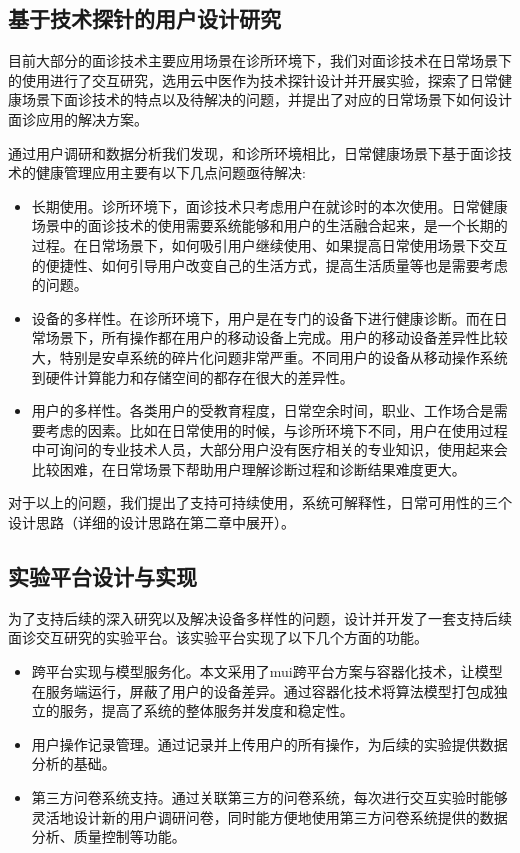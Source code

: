 \subsection{基于技术探针的用户设计研究}

目前大部分的面诊技术主要应用场景在诊所环境下，我们对面诊技术在日常场景下的使用进行了交互研究，选用云中医作为技术探针设计并开展实验，探索了日常健康场景下面诊技术的特点以及待解决的问题，并提出了对应的日常场景下如何设计面诊应用的解决方案。

通过用户调研和数据分析我们发现，和诊所环境相比，日常健康场景下基于面诊技术的健康管理应用主要有以下几点问题亟待解决: 

\begin{itemize}
    
    \item 长期使用。诊所环境下，面诊技术只考虑用户在就诊时的本次使用。日常健康场景中的面诊技术的使用需要系统能够和用户的生活融合起来，是一个长期的过程。在日常场景下，如何吸引用户继续使用、如果提高日常使用场景下交互的便捷性、如何引导用户改变自己的生活方式，提高生活质量等也是需要考虑的问题。

    \item 设备的多样性。在诊所环境下，用户是在专门的设备下进行健康诊断。而在日常场景下，所有操作都在用户的移动设备上完成。用户的移动设备差异性比较大，特别是安卓系统的碎片化问题非常严重。不同用户的设备从移动操作系统到硬件计算能力和存储空间的都存在很大的差异性。
    
    \item 用户的多样性。各类用户的受教育程度，日常空余时间，职业、工作场合是需要考虑的因素。比如在日常使用的时候，与诊所环境下不同，用户在使用过程中可询问的专业技术人员，大部分用户没有医疗相关的专业知识，使用起来会比较困难，在日常场景下帮助用户理解诊断过程和诊断结果难度更大。

\end{itemize}

对于以上的问题，我们提出了支持可持续使用，系统可解释性，日常可用性的三个设计思路（详细的设计思路在第二章中展开）。

\subsection{实验平台设计与实现}

为了支持后续的深入研究以及解决设备多样性的问题，设计并开发了一套支持后续面诊交互研究的实验平台。该实验平台实现了以下几个方面的功能。

\begin{itemize}

    \item 跨平台实现与模型服务化。本文采用了mui跨平台方案与容器化技术，让模型在服务端运行，屏蔽了用户的设备差异。通过容器化技术将算法模型打包成独立的服务，提高了系统的整体服务并发度和稳定性。

    \item 用户操作记录管理。通过记录并上传用户的所有操作，为后续的实验提供数据分析的基础。

    \item 第三方问卷系统支持。通过关联第三方的问卷系统，每次进行交互实验时能够灵活地设计新的用户调研问卷，同时能方便地使用第三方问卷系统提供的数据分析、质量控制等功能。

\end{itemize}

